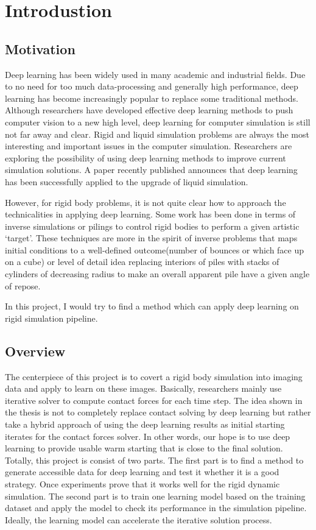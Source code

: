\chapter{Introdustion}

\section{Motivation}

    Deep learning has been widely used in many academic and industrial fields. Due to no need for too much data-processing and generally high performance, deep learning has become increasingly popular to replace some traditional methods. Although researchers have developed effective deep learning methods to push computer vision to a new high level, deep learning for computer simulation is still not far away and clear. Rigid and liquid simulation problems are always the most interesting and important issues in the computer simulation. Researchers are exploring the possibility of using deep learning methods to improve current simulation solutions. A paper recently published announces that deep learning has been successfully applied to the upgrade of liquid simulation\cite{CNNFluid2016}.

    However, for rigid body problems, it is not quite clear how to approach the technicalities in applying deep learning. Some work has been done in terms of inverse simulations or pilings to control rigid bodies to perform a given artistic `target'. These techniques are more in the spirit of inverse problems that maps initial conditions to a well-defined outcome(number of bounces or which face up on a cube) or level of detail idea replacing interiors of piles with stacks of cylinders of decreasing radius to make an overall apparent pile have a given angle of repose.

    In this project, I would try to find a method which can apply deep learning on rigid simulation pipeline.

\section{Overview}
        The centerpiece of this project is to covert a rigid body simulation into imaging data and apply to learn on these images. Basically, researchers mainly use iterative solver to compute contact forces for each time step. The idea shown in the thesis is not to completely replace contact solving by deep learning but rather take a hybrid approach of using the deep learning results as initial starting iterates for the contact forces solver. In other words, our hope is to use deep learning to provide usable warm starting that is close to the final solution. Totally, this project is consist of two parts. The first part is to find a method to generate accessible data for deep learning and test it whether it is a good strategy. Once experiments prove that it works well for the rigid dynamic simulation. The second part is to train one learning model based on the training dataset and apply the model to check its performance in the simulation pipeline. Ideally, the learning model can accelerate the iterative solution process.

